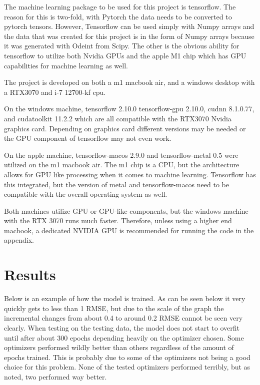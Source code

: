 \documentclass[12pt]{article}
\begin{document}
	The machine learning package to be used for this project is tensorflow. The reason for this is two-fold, with Pytorch the data needs to be converted to pytorch tensors. However, Tensorflow can be used simply with Numpy arrays and the data that was created for this project is in the form of Numpy arrays because it was generated with Odeint from Scipy. The other is the obvious ability for tensorflow to utilize both Nvidia GPUs and the apple M1 chip which has GPU capabilities for machine learning as well.

	The project is developed on both a m1 macbook air, and a windows desktop with a RTX3070 and i-7 12700-kf cpu.

	On the windows machine, tensorflow 2.10.0 tensorflow-gpu 2.10.0, cudnn 8.1.0.77, and cudatoolkit 11.2.2 which are all compatible with the RTX3070 Nvidia graphics card. Depending on graphics card different versions may be needed or the GPU component of tensorflow may not even work.

	On the apple machine, tensorflow-macos 2.9.0 and tensorflow-metal 0.5 were utilized on the m1 macbook air. The m1 chip is a CPU, but the architecture allows for GPU like processing when it comes to machine learning. Tensorflow has this integrated, but the version of metal and tensorflow-macos need to be compatible with the overall operating system as well.

	Both machines utilize GPU or GPU-like components, but the windows machine with the RTX 3070 runs much faster. Therefore, unless using a higher end macbook, a dedicated NVIDIA GPU is recommended for running the code in the appendix.

	\section*{Results}

	Below is an example of how the model is trained. As can be seen below it very quickly gets to less than 1 RMSE, but due to the scale of the graph the incremental changes from about 0.4 to around 0.2 RMSE cannot be seen very clearly. When testing on the testing data, the model does not start to overfit until after about 300 epochs depending heavily on the optimizer chosen. Some optimizers performed wildly better than others regardless of the amount of epochs trained. This is probably due to some of the optimizers not being a good choice for this problem. None of the tested optimizers performed terribly, but as noted, two performed way better.
\end{document}
